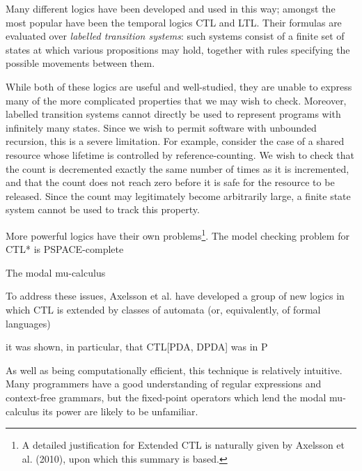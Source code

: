 \documentclass[11pt]{article}
\theoremstyle{definition}
\begin{document}
Many different logics have been developed and used in this way; amongst the
most popular have been the temporal logics CTL and LTL. Their formulas are
evaluated over \textit{labelled transition systems}: such systems consist of a
finite set of states at which various propositions may hold, together with
rules specifying the possible movements between them. %

While both of these logics are useful and well-studied, they are unable to
express many of the more complicated properties that we may wish to check.
Moreover, labelled transition systems cannot directly be used to represent
programs with infinitely many states. Since we wish to permit software with
unbounded recursion, this is a severe limitation. For example, consider the
case of a shared resource whose lifetime is controlled by reference-counting.
We wish to check that the count is decremented exactly the same number of times
as it is incremented, and that the count does not reach zero before it is safe
for the resource to be released. Since the count may legitimately become
arbitrarily large, a finite state system cannot be used to track this property.


More powerful logics have their own problems\footnote{A detailed
justification for Extended CTL is naturally given by Axelsson et al. (2010),
upon which this summary is based.}. The model checking problem for CTL* is
PSPACE-complete\cite{Kreutzer10}\cite{sistla1985complexity}

The modal mu-calculus 


To address these issues, Axelsson et al. have developed a group of new logics 
in which CTL is extended by classes of automata (or, equivalently, of formal languages)

it was shown, in particular, that CTL[PDA, DPDA] was in P


As well as being computationally efficient, this technique is relatively
intuitive. Many programmers have a good understanding of regular expressions
and context-free grammars, but the fixed-point operators which lend the modal
mu-calculus its power are likely to be unfamiliar.

\end{document}
